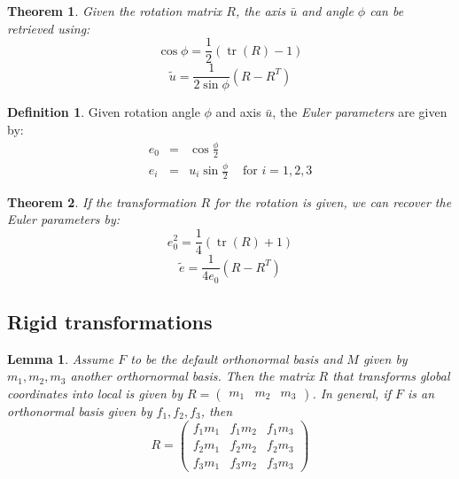 \documentclass{article}
\newtheorem{theorem}{Theorem}[section]
\newtheorem{lemma}{Lemma}[section]
\theoremstyle{definition}
\newtheorem{definition}{Definition}[section]
\DeclareMathOperator{\tr}{tr}
\begin{document}
\begin{theorem}
Given the rotation matrix $R$, the axis $\bar{u}$ and angle $\phi$ can be retrieved using:
\begin{equation*}
\cos \phi = \frac{1}{2}(\tr(R) - 1)
\end{equation*}
\begin{equation*}
\tilde{u} = \frac{1}{2 \sin \phi}(R - R^T)
\end{equation*}
\end{theorem}

\begin{definition}
Given rotation angle $\phi$ and axis $\bar{u}$, the \emph{Euler parameters} are given by:
\begin{equation*}
\begin{array}{lclr}
e_0 & = & \cos \frac{\phi}{2} & \\
e_i & = & u_i \sin \frac{\phi}{2} & \mbox{ for } i = 1, 2, 3
\end{array}
\end{equation*}
\end{definition}

\begin{theorem}
If the transformation $R$ for the rotation is given, we can recover the Euler parameters by:
\begin{equation*}
e_0^2 = \frac{1}{4}(\tr(R) + 1)
\end{equation*}
\begin{equation*}
\tilde{e} = \frac{1}{4e_0}(R - R^T)
\end{equation*}
\end{theorem}

\subsection{Rigid transformations}
\begin{lemma}
Assume $F$ to be the default orthonormal basis and $M$ given by $m_1, m_2, m_3$ another orthornormal basis. Then the matrix $R$ that transforms global coordinates into local is given by $R = \begin{pmatrix} m_1 & m_2 & m_3 \end{pmatrix}$.\newline
In general, if $F$ is an orthonormal basis given by $f_1, f_2, f_3$, then
\begin{equation*}
R = \begin{pmatrix}
f_1m_1 & f_1m_2 & f_1m_3 \\
f_2m_1 & f_2m_2 & f_2m_3 \\
f_3m_1 & f_3m_2 & f_3m_3
\end{pmatrix}
\end{equation*}
\end{lemma}
\end{document}
